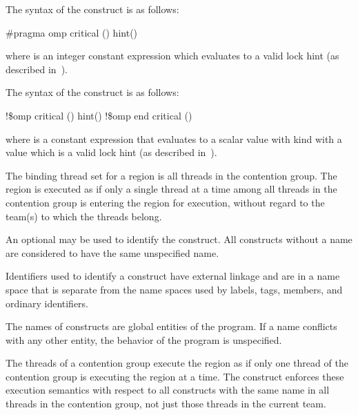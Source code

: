 \syntax
\ccppspecificstart
The syntax of the  construct is as follows:

\begin{boxedcode}
\#pragma omp critical \plc{[}() \plc{[}hint()\plc{] ] new-line}
\end{boxedcode}

where  is an integer constant expression which
evaluates to a valid lock hint (as described 
in~).

\fortranspecificstart
The syntax of the  construct is as follows:

\begin{boxedcode}
!\$omp critical \plc{[}() \plc{[}hint()\plc{] ] new-line}
!\$omp end critical \plc{[}()\plc{]}  
\end{boxedcode}

where  is a constant expression that evaluates to
a scalar value with kind  with a value
which is a valid lock hint (as described 
in~).
\fortranspecificend

\binding
The binding thread set for a  region is all threads in the contention group. 
The region is executed as if only a single thread at a time among all threads in the 
contention group is entering the region for execution, without regard to the team(s) to which the threads belong. 

\descr
An optional  may be used to identify the  construct. All  
constructs without a name are considered to have the same unspecified name. 

\ccppspecificstart
Identifiers used to identify a  construct have external linkage and are in a 
name space that is separate from the name spaces used by labels, tags, members, and 
ordinary identifiers.
\ccppspecificend

\fortranspecificstart
The names of  constructs are global entities of the program. If a name 
conflicts with any other entity, the behavior of the program is unspecified.
\fortranspecificend

The threads of a contention group execute the  region as if only one thread of the contention group is executing the  region at a time.
The  construct enforces these execution semantics with respect to all  constructs with the same name in all 
threads in the contention group, not just those threads in the current team.

